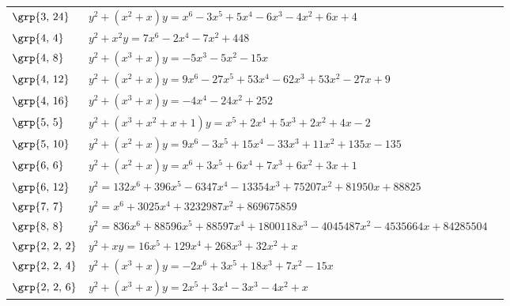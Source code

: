 \begin{longtable}{@{}>{\raggedright\arraybackslash}p{1.35cm}
 >{\raggedright\arraybackslash}p{}
 >{\raggedright\arraybackslash}p{1.25cm}@{}}
$\grp{3,\,24}$ & \href{https://alpha.lmfdb.org/Genus2Curve/Q/?jump=[[4,6,-4,-6,5,-3,1],[0,1,1]]}{$y^2 + (x^{2}+x)y = x^{6}-3x^{5}+5x^{4}-6x^{3}-4x^{2}+6x+4$} & \cite{BookerSutherland}\\
$\grp{4,\,4}$ & \href{https://alpha.lmfdb.org/Genus2Curve/Q/?jump=[[448,0,-7,0,-2,0,7],[0,0,1]]}{$y^2 + x^{2}y = 7x^{6}-2x^{4}-7x^{2}+448$} & \cite{BSSVY}\\
$\grp{4,\,8}$ & \href{https://alpha.lmfdb.org/Genus2Curve/Q/?jump=[[0,-15,-5,-5],[0,1,0,1]]}{$y^2 + (x^{3}+x)y = -5x^{3}-5x^{2}-15x$} & \cite{BookerSutherland}\\
$\grp{4,\,12}$ & \href{https://alpha.lmfdb.org/Genus2Curve/Q/?jump=[[9,-27,53,-62,53,-27,9],[0,1,1]]}{$y^2 + (x^{2}+x)y = 9x^{6}-27x^{5}+53x^{4}-62x^{3}+53x^{2}-27x+9$} & \cite{BookerSutherland}\\
$\grp{4,\,16}$ & \href{https://alpha.lmfdb.org/Genus2Curve/Q/?jump=[[252,0,-24,0,-4],[0,1,0,1]]}{$y^2 + (x^{3}+x)y = -4x^{4}-24x^{2}+252$} & \cite{BookerSutherland}\\
$\grp{5,\,5}$ & \href{https://alpha.lmfdb.org/Genus2Curve/Q/?jump=[[-2,4,2,5,2,1],[1,1,1,1]]}{$y^2 + (x^{3}+x^{2}+x+1)y = x^{5}+2x^{4}+5x^{3}+2x^{2}+4x-2$} & \cite{HLP2000}\\
$\grp{5,\,10}$ & \href{https://alpha.lmfdb.org/Genus2Curve/Q/?jump=[[-135,135,11,-33,15,-3,9],[0,1,1]]}{$y^2 + (x^{2}+x)y = 9x^{6}-3x^{5}+15x^{4}-33x^{3}+11x^{2}+135x-135$} & \cite{HLP2000}\\
$\grp{6,\,6}$ & \href{https://www.lmfdb.org/Genus2Curve/Q/196/a/21952/1}{$y^2 + (x^{2}+x)y = x^{6}+3x^{5}+6x^{4}+7x^{3}+6x^{2}+3x+1$} & \cite{HLP2000}\\
$\grp{6,\,12}$ & $y^2 = 132x^{6}+396x^{5}-6347x^{4}-13354x^{3}+75207x^{2}+81950x+88825$ & \cite{HLP2000}\\
$\grp{7,\,7}$ & $y^2 = x^{6}+3025x^{4}+3232987x^{2}+869675859$ & \cite{HLP2000}\\
$\grp{8,\,8}$ & $y^2 = 836x^{6}+88596x^{5}+88597x^{4}+1800118x^{3}-4045487x^{2}-4535664x+84285504$ & \cite{HLP2000}\\
$\grp{2,\,2,\,2}$ & \href{https://alpha.lmfdb.org/Genus2Curve/Q/?jump=[[0,1,32,268,129,16],[0,1]]}{$y^2 + xy = 16x^{5}+129x^{4}+268x^{3}+32x^{2}+x$} & \cite{BSSVY}\\
$\grp{2,\,2,\,4}$ & \href{https://alpha.lmfdb.org/Genus2Curve/Q/?jump=[[0,-15,7,18,0,3,-2],[0,1,0,1]]}{$y^2 + (x^{3}+x)y = -2x^{6}+3x^{5}+18x^{3}+7x^{2}-15x$} & \cite{BSSVY}\\
$\grp{2,\,2,\,6}$ & \href{https://www.lmfdb.org/Genus2Curve/Q/600/a/18000/1}{$y^2 + (x^{3}+x)y = 2x^{5}+3x^{4}-3x^{3}-4x^{2}+x$} & \cite{BSSVY}\\

\end{longtable}
